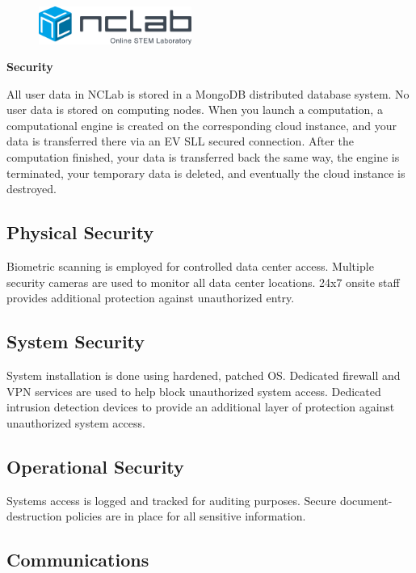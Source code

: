 \documentclass{article}
\begin{document}
\large

\vbox{}
\begin{figure}[!ht]
\includegraphics[width=5cm]{logo.png}
\vspace{4mm}
\end{figure}


\centerline{\huge \bf Security}
\vspace{6mm}
\noindent
All user data in NCLab is stored in a MongoDB distributed database system. No user data is stored on computing nodes. When you launch a computation, a computational engine is created on the corresponding cloud instance, and your data is transferred there via an EV SLL secured connection. After the computation finished, your data is transferred back the same way, the engine is terminated, your temporary data is deleted, and eventually the cloud instance is destroyed. 


\subsection*{Physical Security}

Biometric scanning is employed for controlled data center access. Multiple security cameras are used to monitor all data center locations. 24x7 onsite staff provides additional protection against unauthorized entry.


\subsection*{System Security}

System installation is done using hardened, patched OS. Dedicated firewall and VPN services are used to help block unauthorized system access. Dedicated intrusion detection devices to provide an additional layer of protection against unauthorized system access.


\subsection*{Operational Security}


Systems access is logged and tracked for auditing purposes. Secure document-destruction policies are in place for all sensitive information.

\subsection*{Communications}
\end{document}
